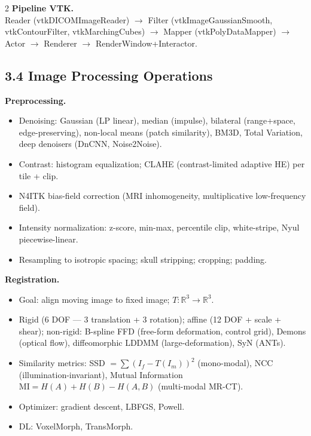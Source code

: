 \begin{paracol}{2}
\textbf{Pipeline VTK.}\\
{\scriptsize\ttfamily Reader (vtkDICOMImageReader) $\to$ Filter (vtkImageGaussianSmooth, vtkContourFilter, vtkMarchingCubes) $\to$ Mapper (vtkPolyDataMapper) $\to$ Actor $\to$ Renderer $\to$ RenderWindow+Interactor.}

\switchcolumn*

\subsection*{3.4 Image Processing Operations}
\textbf{Preprocessing.}
\begin{itemize}[leftmargin=*,nosep]
  \item Denoising: Gaussian (LP linear), median (impulse), bilateral (range+space, edge-preserving), non-local means (patch similarity), BM3D, Total Variation, deep denoisers (DnCNN, Noise2Noise).
  \item Contrast: histogram equalization; CLAHE (contrast-limited adaptive HE) per tile + clip.
  \item N4ITK bias-field correction (MRI inhomogeneity, multiplicative low-frequency field).
  \item Intensity normalization: z-score, min-max, percentile clip, white-stripe, Nyul piecewise-linear.
  \item Resampling to isotropic spacing; skull stripping; cropping; padding.
\end{itemize}

\textbf{Registration.}
\begin{itemize}[leftmargin=*,nosep]
  \item Goal: align moving image to fixed image; $T:\mathbb R^3\to\mathbb R^3$.
  \item Rigid (6 DOF — 3 translation + 3 rotation); affine (12 DOF + scale + shear); non-rigid: B-spline FFD (free-form deformation, control grid), Demons (optical flow), diffeomorphic LDDMM (large-deformation), SyN (ANTs).
  \item Similarity metrics: SSD $=\sum(I_f-T(I_m))^2$ (mono-modal), NCC (illumination-invariant), Mutual Information $\mathrm{MI}=H(A)+H(B)-H(A,B)$ (multi-modal MR-CT).
  \item Optimizer: gradient descent, LBFGS, Powell.
  \item DL: VoxelMorph, TransMorph.
\end{itemize}


\end{paracol}
